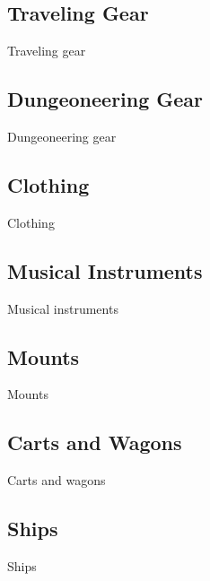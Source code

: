 \subsection{Traveling Gear}

Traveling gear

\subsection{Dungeoneering Gear}

Dungeoneering gear

\subsection{Clothing}

Clothing

\subsection{Musical Instruments}

Musical instruments

\subsection{Mounts}

Mounts

\subsection{Carts and Wagons}

Carts and wagons

\subsection{Ships}

Ships
